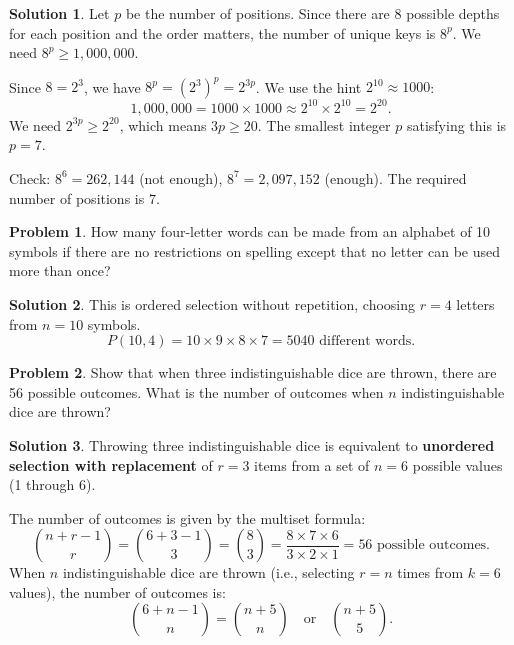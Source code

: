 \documentclass[12pt,a4paper]{article}
\numberwithin{equation}{section}
\theoremstyle{plain}
\theoremstyle{definition}
\newtheorem{problem}{Problem}
\theoremstyle{solutionstyle}
\newtheorem*{solution*}{Solution} %
\theoremstyle{definition} %
\begin{document}
	\begin{solution*}
		Let $p$ be the number of positions. Since there are 8 possible depths for each position and the order matters, the number of unique keys is $8^p$. We need $8^p \geq 1,000,000$.
		
		Since $8 = 2^3$, we have $8^p = (2^3)^p = 2^{3p}$.
		We use the hint $2^{10} \approx 1000$:
		\[
		1,000,000 = 1000 \times 1000 \approx 2^{10} \times 2^{10} = 2^{20}.
		\]
		We need $2^{3p} \geq 2^{20}$, which means $3p \geq 20$.
		The smallest integer $p$ satisfying this is $p = 7$.
		
		Check: $8^6 = 262,144$ (not enough), $8^7 = 2,097,152$ (enough).
		The required number of positions is $\boxed{7}$.
	\end{solution*}
	
	\begin{problem}
		How many four-letter words can be made from an alphabet of 10 symbols if there are no restrictions on spelling except that no letter can be used more than once? 
	\end{problem}
	
	\begin{solution*}
		This is ordered selection without repetition, choosing $r=4$ letters from $n=10$ symbols.
		\[
		P(10, 4) = 10 \times 9 \times 8 \times 7 = \boxed{5040} \textrm{ different words.}
		\]
	\end{solution*}
	
	\begin{problem}
		Show that when three indistinguishable dice are thrown, there are 56 possible outcomes. What is the number of outcomes when $n$ indistinguishable dice are thrown?
	\end{problem}
	
	\begin{solution*}
		Throwing three indistinguishable dice is equivalent to \textbf{unordered selection with replacement} of $r=3$ items from a set of $n=6$ possible values (1 through 6).
		
		The number of outcomes is given by the multiset formula:
		\[
		\binom{n+r-1}{r} = \binom{6+3-1}{3} = \binom{8}{3} = \frac{8 \times 7 \times 6}{3 \times 2 \times 1} = \boxed{56} \textrm{ possible outcomes.}
		\]
		When $n$ indistinguishable dice are thrown (i.e., selecting $r=n$ times from $k=6$ values), the number of outcomes is:
		\[
		\binom{6+n-1}{n} = \boxed{\binom{n+5}{n} \quad \text{or} \quad \binom{n+5}{5}.}
		\]
	\end{solution*}
	
\end{document}
